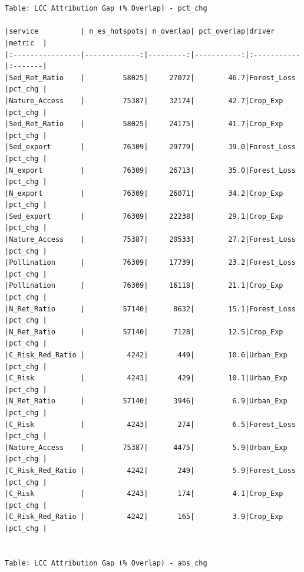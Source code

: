 \documentclass[
  letterpaper,
  DIV=11,
  numbers=noendperiod]{scrartcl}
\begin{document}
\begin{verbatim}


Table: LCC Attribution Gap (% Overlap) - pct_chg

|service          | n_es_hotspots| n_overlap| pct_overlap|driver      |metric  |
|:----------------|-------------:|---------:|-----------:|:-----------|:-------|
|Sed_Ret_Ratio    |         58025|     27072|        46.7|Forest_Loss |pct_chg |
|Nature_Access    |         75387|     32174|        42.7|Crop_Exp    |pct_chg |
|Sed_Ret_Ratio    |         58025|     24175|        41.7|Crop_Exp    |pct_chg |
|Sed_export       |         76309|     29779|        39.0|Forest_Loss |pct_chg |
|N_export         |         76309|     26713|        35.0|Forest_Loss |pct_chg |
|N_export         |         76309|     26071|        34.2|Crop_Exp    |pct_chg |
|Sed_export       |         76309|     22238|        29.1|Crop_Exp    |pct_chg |
|Nature_Access    |         75387|     20533|        27.2|Forest_Loss |pct_chg |
|Pollination      |         76309|     17739|        23.2|Forest_Loss |pct_chg |
|Pollination      |         76309|     16118|        21.1|Crop_Exp    |pct_chg |
|N_Ret_Ratio      |         57140|      8632|        15.1|Forest_Loss |pct_chg |
|N_Ret_Ratio      |         57140|      7128|        12.5|Crop_Exp    |pct_chg |
|C_Risk_Red_Ratio |          4242|       449|        10.6|Urban_Exp   |pct_chg |
|C_Risk           |          4243|       429|        10.1|Urban_Exp   |pct_chg |
|N_Ret_Ratio      |         57140|      3946|         6.9|Urban_Exp   |pct_chg |
|C_Risk           |          4243|       274|         6.5|Forest_Loss |pct_chg |
|Nature_Access    |         75387|      4475|         5.9|Urban_Exp   |pct_chg |
|C_Risk_Red_Ratio |          4242|       249|         5.9|Forest_Loss |pct_chg |
|C_Risk           |          4243|       174|         4.1|Crop_Exp    |pct_chg |
|C_Risk_Red_Ratio |          4242|       165|         3.9|Crop_Exp    |pct_chg |


Table: LCC Attribution Gap (% Overlap) - abs_chg


\end{verbatim}
\end{document}
